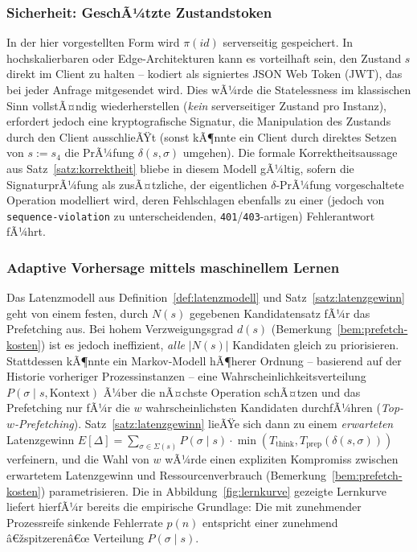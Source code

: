 ﻿\documentclass[a4paper,12pt]{article}
\theoremstyle{definition}
\begin{document}
\subsubsection{Sicherheit: GeschÃ¼tzte Zustandstoken}

In der hier vorgestellten Form wird $\pi(id)$ serverseitig gespeichert. In hochskalierbaren
oder Edge-Architekturen kann es vorteilhaft sein, den Zustand $s$ direkt im Client zu
halten -- kodiert als signiertes JSON Web Token (JWT), das bei jeder Anfrage mitgesendet
wird. Dies wÃ¼rde die Statelessness im klassischen Sinn vollstÃ¤ndig wiederherstellen
(\emph{kein} serverseitiger Zustand pro Instanz), erfordert jedoch eine kryptografische
Signatur, die Manipulation des Zustands durch den Client ausschlieÃŸt (sonst kÃ¶nnte ein
Client durch direktes Setzen von $s:=s_4$ die PrÃ¼fung $\delta(s,\sigma)$ umgehen). Die
formale Korrektheitsaussage aus Satz~\ref{satz:korrektheit} bliebe in diesem Modell
gÃ¼ltig, sofern die SignaturprÃ¼fung als zusÃ¤tzliche, der eigentlichen
$\delta$-PrÃ¼fung vorgeschaltete Operation modelliert wird, deren Fehlschlagen ebenfalls zu
einer (jedoch von \texttt{sequence-violation} zu unterscheidenden,
\texttt{401}/\texttt{403}-artigen) Fehlerantwort fÃ¼hrt.

\subsubsection{Adaptive Vorhersage mittels maschinellem Lernen}

Das Latenzmodell aus Definition~\ref{def:latenzmodell} und Satz~\ref{satz:latenzgewinn}
geht von einem festen, durch $N(s)$ gegebenen Kandidatensatz fÃ¼r das Prefetching aus. Bei
hohem Verzweigungsgrad $d(s)$ (Bemerkung~\ref{bem:prefetch-kosten}) ist es jedoch
ineffizient, \emph{alle} $|N(s)|$ Kandidaten gleich zu priorisieren. Stattdessen kÃ¶nnte ein
Markov-Modell hÃ¶herer Ordnung -- basierend auf der Historie vorheriger Prozessinstanzen --
eine Wahrscheinlichkeitsverteilung $P(\sigma \mid s, \text{Kontext})$ Ã¼ber die nÃ¤chste
Operation schÃ¤tzen und das Prefetching nur fÃ¼r die $w$ wahrscheinlichsten Kandidaten
durchfÃ¼hren (\emph{Top-$w$-Prefetching}). Satz~\ref{satz:latenzgewinn} lieÃŸe sich dann zu
einem \emph{erwarteten} Latenzgewinn
$E[\Delta] = \sum_{\sigma\in\Sigma(s)} P(\sigma\mid s)\cdot
\min(T_{\mathrm{think}},T_{\mathrm{prep}}(\delta(s,\sigma)))$ verfeinern, und die Wahl von
$w$ wÃ¼rde einen expliziten Kompromiss zwischen erwartetem Latenzgewinn und
Ressourcenverbrauch (Bemerkung~\ref{bem:prefetch-kosten}) parametrisieren. Die in
Abbildung~\ref{fig:lernkurve} gezeigte Lernkurve liefert hierfÃ¼r bereits die empirische
Grundlage: Die mit zunehmender Prozessreife sinkende Fehlerrate $p(n)$ entspricht einer
zunehmend â€žspitzerenâ€œ Verteilung $P(\sigma\mid s)$.
\end{document}
